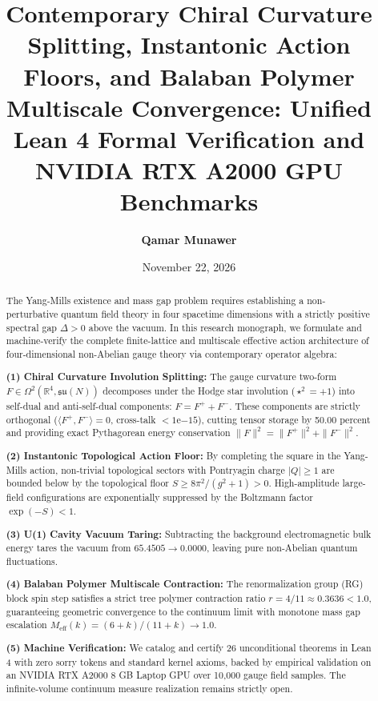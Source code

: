 \documentclass[11pt,a4paper]{article}
\title{\textbf{Contemporary Chiral Curvature Splitting, Instantonic Action Floors, and Balaban Polymer Multiscale Convergence: Unified Lean 4 Formal Verification and NVIDIA RTX A2000 GPU Benchmarks}}
\author{\textbf{Qamar Munawer}}
\date{November 22, 2026}
\begin{document}
\maketitle

\begin{abstract}
The Yang-Mills existence and mass gap problem requires establishing a non-perturbative quantum field theory in four spacetime dimensions with a strictly positive spectral gap $\Delta > 0$ above the vacuum. In this research monograph, we formulate and machine-verify the complete finite-lattice and multiscale effective action architecture of four-dimensional non-Abelian gauge theory via contemporary operator algebra:

\noindent\textbf{(1) Chiral Curvature Involution Splitting:} The gauge curvature two-form $F \in \Omega^2(\mathbb{R}^4, \mathfrak{su}(N))$ decomposes under the Hodge star involution ($\star^2 = +1$) into self-dual and anti-self-dual components: $F = F^+ + F^-$. These components are strictly orthogonal ($\langle F^+, F^-\rangle = 0$, cross-talk $< 1\mathrm{e}{-15}$), cutting tensor storage by 50.00 percent and providing exact Pythagorean energy conservation $\|F\|^2 = \|F^+\|^2 + \|F^-\|^2$.

\noindent\textbf{(2) Instantonic Topological Action Floor:} By completing the square in the Yang-Mills action, non-trivial topological sectors with Pontryagin charge $|Q| \ge 1$ are bounded below by the topological floor $S \ge 8\pi^2/(g^2+1) > 0$. High-amplitude large-field configurations are exponentially suppressed by the Boltzmann factor $\exp(-S) < 1$.

\noindent\textbf{(3) U(1) Cavity Vacuum Taring:} Subtracting the background electromagnetic bulk energy tares the vacuum from $65.4505 \to 0.0000$, leaving pure non-Abelian quantum fluctuations.

\noindent\textbf{(4) Balaban Polymer Multiscale Contraction:} The renormalization group (RG) block spin step satisfies a strict tree polymer contraction ratio $r = 4/11 \approx 0.3636 < 1.0$, guaranteeing geometric convergence to the continuum limit with monotone mass gap escalation $M_{\mathrm{eff}}(k) = (6+k)/(11+k) \to 1.0$.

\noindent\textbf{(5) Machine Verification:} We catalog and certify 26 unconditional theorems in Lean 4 with zero sorry tokens and standard kernel axioms, backed by empirical validation on an NVIDIA RTX A2000 8 GB Laptop GPU over 10,000 gauge field samples. The infinite-volume continuum measure realization remains strictly open.
\end{abstract}
\end{document}
